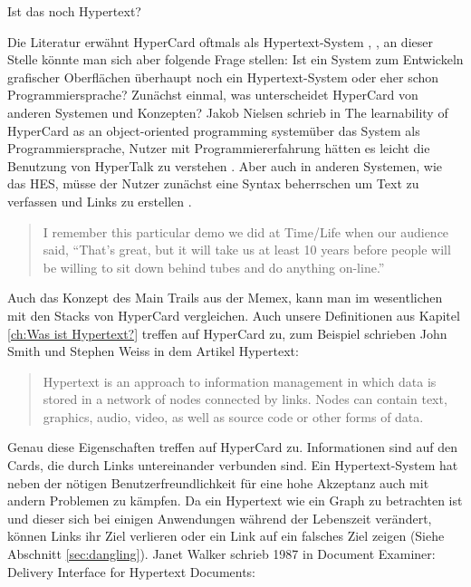 \begin{section}{Ist das noch Hypertext?}
\label{sec:nochHypertext}

Die Literatur erwähnt HyperCard oftmals als Hypertext-System \cite{Nielsen1995} \cite{Dam1988}, \cite{Smith1988}, an dieser Stelle könnte man sich aber folgende Frage stellen: Ist ein System zum Entwickeln grafischer Oberflächen überhaupt noch ein Hypertext-System oder eher schon Programmiersprache? 
Zunächst einmal, was unterscheidet HyperCard von anderen Systemen und Konzepten? Jakob Nielsen schrieb in \glqq The learnability of HyperCard as an object-oriented programming system\grqq{ }über das System als Programmiersprache, Nutzer mit Programmiererfahrung hätten es leicht die Benutzung von HyperTalk zu verstehen \cite{Nielsen1991}. Aber auch in anderen Systemen, wie das HES, müsse der Nutzer zunächst eine Syntax beherrschen um Text zu verfassen und Links zu erstellen \cite{Dam1969}.

\begin{quote}
\glqq I remember this particular demo we did at Time/Life when our audience said, “That’s great, but it will take us at least 10 years before people will be willing to sit down behind tubes and do anything on-line.”\grqq{ }\cite{Dam1988}
\end{quote}

Auch das Konzept des Main Trails aus der Memex, kann man im wesentlichen mit den Stacks von HyperCard vergleichen. Auch unsere Definitionen aus Kapitel \ref{ch:Was ist Hypertext?} treffen auf HyperCard zu, zum Beispiel schrieben John Smith und Stephen Weiss in dem Artikel \glqq Hypertext\grqq:

\begin{quote}
\glqq [...] Hypertext is an approach to information management in which data is stored in a network of nodes connected by links. Nodes can contain text, graphics, audio, video, as well as source code or other forms of data.\grqq{ }\cite{Smith1988} 
\end{quote}

Genau diese Eigenschaften treffen auf HyperCard zu. Informationen sind auf den Cards, die durch Links untereinander verbunden sind. Ein Hypertext-System hat neben der nötigen Benutzerfreundlichkeit für eine hohe Akzeptanz auch mit andern Problemen zu kämpfen. Da ein Hypertext wie ein Graph zu betrachten ist und dieser sich bei einigen Anwendungen während der Lebenszeit verändert, können Links ihr Ziel verlieren oder ein Link auf ein falsches Ziel zeigen (Siehe Abschnitt \ref{sec:dangling}). Janet Walker schrieb 1987 in \glqq Document Examiner: Delivery Interface for Hypertext Documents\grqq: 


\end{section}
